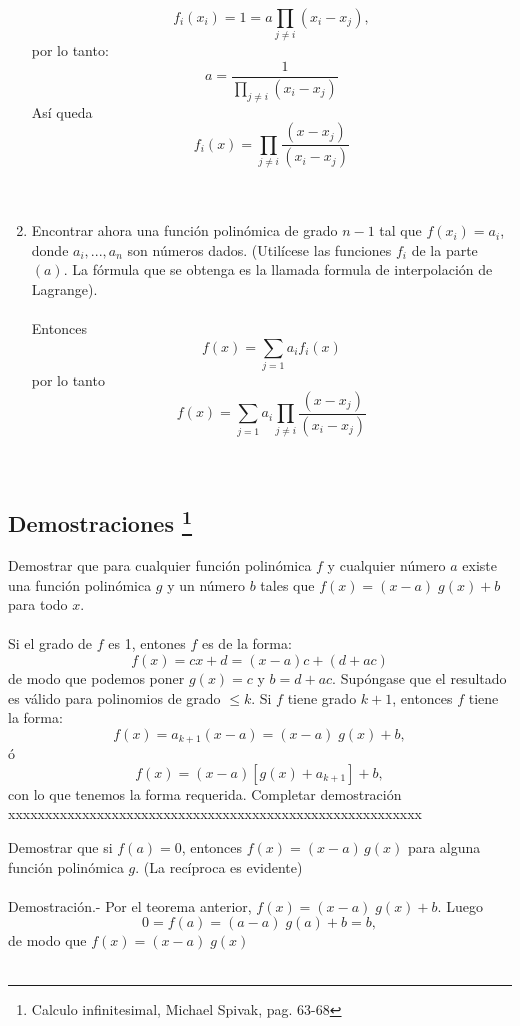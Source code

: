\begin{ej}
\begin{enumerate}[\bfseries a)]
\[
f_i(x_i)=1=a\prod_{j \neq i} (x_i-x_j), 
\]
por lo tanto:
\[
a= \dfrac{1}{\displaystyle\prod_{j \neq i} (x_i-x_j)} 
\]  
Así queda
\[
f_i(x)= \prod_{j \neq i} \dfrac{(x-x_j)}{(x_i-x_j)}  
\]
\\\\
\item Encontrar ahora una función polinómica de grado $n-1$ tal que $f(x_i)=a_i$, donde $a_i,...,a_n$ son números dados. (Utilícese las funciones $f_i$ de la parte $(a)$. La fórmula que se obtenga es la llamada formula de interpolación de Lagrange).\\\\
Entonces \[ f(x) = \sum_{j=1} a_i f_i(x) \]
por lo tanto  \[ f(x) = \sum_{j=1} a_i \prod_{j \neq i} \dfrac{(x-x_j)}{(x_i-x_j)} \]
\\\\
\end{enumerate}
\end{ej}

\subsection[Demostraciones]{Demostraciones \footnote{Calculo infinitesimal, Michael Spivak, pag. 63-68}}
\begin{teo}
Demostrar que para cualquier función polinómica $f$ y cualquier número $a$ existe una función polinómica $g$ \; y un número $b$ tales que $f(x)=(x-a) \; g(x)+b$ para todo $x$. \\\\
Si el grado de $f$ es 1, entones $f$ es de la forma: $$f(x)=cx+d=(x-a)c + (d+ac)$$
de modo que podemos poner $g(x)=c$ \; y \;$b=d+ac$. Supóngase que el resultado es válido para polinomios de grado $\leq k.$ Si $f$ tiene grado $k+1$, entonces $f$ tiene la forma: $$f(x) = a_{k+1} (x-a) = (x-a) \; g(x) + b,$$ ó  $$f(x) = (x-a)[g(x) + a_{k+1}] + b,$$ con lo que tenemos la forma requerida.
{\color{green} Completar demostración xxxxxxxxxxxxxxxxxxxxxxxxxxxxxxxxxxxxxxxxxxxxxxxxxxxxxxxx}
\end{teo}

\begin{teo}
Demostrar que si $f(a)=0$, entonces $f(x)=(x-a)\, g(x)$ para alguna función polinómica $g$. (La recíproca es evidente)\\\\
Demostración.- \; Por el teorema anterior, $f(x)=(x-a)\; g(x) + b.$ Luego $$0=f(a)=(a-a) \; g(a) + b = b,$$
de modo que $f(x) = (x-a) \; g(x)$\\\\
\end{teo}

